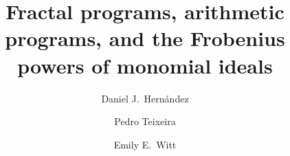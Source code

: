 \documentclass{amsart}
\begin{document}
\title[Fractal and arithmetic programs]{Fractal programs, arithmetic programs, and the Frobenius powers of monomial ideals}
\author{Daniel J.~Hern\'andez}
\author{Pedro Teixeira}
\author{Emily E.~Witt}
\maketitle

\newcommand{\CheckedBox}{\text{\rlap{$\checkmark$}}\Box}
\end{document}
